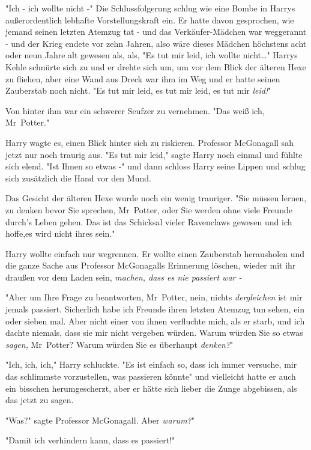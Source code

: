 {"Ich - ich wollte nicht -" Die Schlussfolgerung schlug wie eine Bombe in Harrys außerordentlich lebhafte Vorstellungskraft ein. Er hatte davon gesprochen, wie jemand seinen letzten Atemzug tat - und das Verkäufer-Mädchen war weggerannt - und der Krieg endete vor zehn Jahren, also wäre dieses Mädchen höchstens acht oder neun Jahre alt gewesen als, als, "Es tut mir leid, ich wollte nicht…" Harrys Kehle schnürte sich zu und er drehte sich um, um vor dem Blick der älteren Hexe zu fliehen, aber eine Wand aus Dreck war ihm im Weg und er hatte seinen Zauberstab noch nicht. "Es tut mir leid, es tut mir leid, es tut mir \emph{leid!}"

Von hinter ihm war ein schwerer Seufzer zu vernehmen. "Das weiß ich, Mr~Potter."

Harry wagte es, einen Blick hinter sich zu riskieren. Professor McGonagall sah jetzt nur noch traurig aus. "Es tut mir leid," sagte Harry noch einmal und fühlte sich elend. "Ist Ihnen so etwas -" und dann schloss Harry seine Lippen und schlug sich zusätzlich die Hand vor den Mund.

Das Gesicht der älteren Hexe wurde noch ein wenig trauriger. "Sie müssen lernen, zu denken bevor Sie sprechen, Mr~Potter, oder Sie werden ohne viele Freunde durch's Leben gehen. Das ist das Schicksal vieler Ravenclaws gewesen und ich hoffe,es wird nicht ihres sein."

Harry wollte einfach nur wegrennen. Er wollte einen Zauberstab herausholen und die ganze Sache aus Professor McGonagalls Erinnerung löschen, wieder mit ihr draußen vor dem Laden sein, \emph{machen, dass es nie passiert war -}

"Aber um Ihre Frage zu beantworten, Mr~Potter, nein, nichts \emph{dergleichen} ist mir jemals passiert. Sicherlich habe ich Freunde ihren letzten Atemzug tun sehen, ein oder sieben mal. Aber nicht einer von ihnen verfluchte mich, als er starb, und ich dachte niemals, dass sie mir nicht vergeben würden. Warum würden Sie so etwas \emph{sagen,} Mr~Potter? Warum würden Sie es überhaupt \emph{denken?}"

"Ich, ich, ich," Harry schluckte. "Es ist einfach so, dass ich immer versuche, mir das schlimmste vorzustellen, was passieren könnte" und vielleicht hatte er auch ein bisschen herumgescherzt, aber er hätte sich lieber die Zunge abgebissen, als das jetzt zu sagen.

"Was?" sagte Professor McGonagall. Aber \emph{warum?}"

"Damit ich verhindern kann, dass es passiert!"

}
